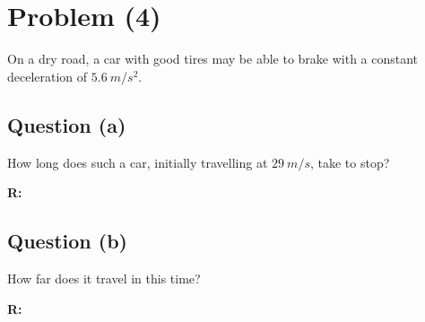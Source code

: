 \section{Problem (4)}
	On a dry road, a car with good tires may be able to brake with a constant deceleration of $5.6 \ m/s^{2}$.

	\subsection{Question (a)}
		How long does such a car, initially travelling at $29 \ m/s$, take to stop?

		\textbf{R:} \newline

	\subsection{Question (b)}
		How far does it travel in this time?

		\textbf{R:} \newline
